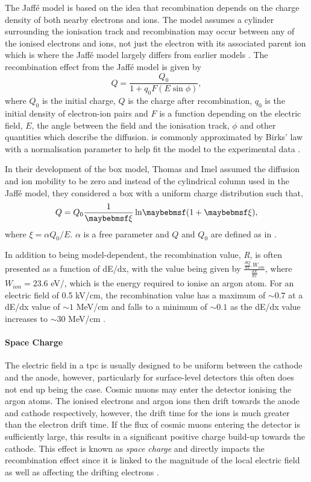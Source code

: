 The Jaff\'{e} model is based on the idea that recombination depends on the charge density of both nearby electrons and ions. The model assumes a cylinder surrounding the ionisation track and recombination may occur between any of the ionised electrons and ions, not just the electron with its associated parent ion which is where the Jaff\'{e} model largely differs from earlier models \cite{Jaffe_model}. The recombination effect from the Jaff\'{e} model is given by 
\begin{equation}\label{Jaffe}
    Q = \frac{Q_{0}}{1+q_{0}F(E\sin{\phi})},
\end{equation}
where $Q_0$ is the initial charge, $Q$ is the charge after recombination, $q_0$ is the initial density of electron-ion pairs and $F$ is a function depending on the electric field, $E$, the angle between the field and the ionisation track, $\phi$ and other quantities which describe the diffusion.  is commonly approximated by Birks' law with a normalisation parameter to help fit the model to the experimental data \cite{LArTPC_book}. 

In their development of the box model, Thomas and Imel assumed the diffusion and ion mobility to be zero and instead of the cylindrical column used in the Jaff\'{e} model, they considered a box with a uniform charge distribution such that, 
\begin{equation}
    Q = Q_{0}\frac{1}{\xi}\lnOfbraces{1+\xi},
\end{equation}
where $\xi = \alpha Q_0/E$. $\alpha$ is a free parameter and $Q$ and $Q_0$ are defined as in \cite{LArTPC_book}\cite{Recombination_box_model}.

In addition to being model-dependent, the recombination value, \textit{R}, is often presented as a function of dE/dx, with the value being given by $\frac{\frac{dQ}{dx}.W_{ion}}{\frac{dE}{dx}}$, where $W_{ion} = 23.6$ eV/\electron, which is the energy required to ionise an argon atom. For an electric field of 0.5 kV/cm, the recombination value has a maximum of $\sim0.7$ at a dE/dx value of $\sim1$ MeV/cm and falls to a minimum of $\sim0.1$ as the dE/dx value increases to $\sim30$ MeV/cm \cite{LArTPC_book}.

\paragraph{Space Charge}
The electric field in a \gls{tpc} is usually designed to be uniform between the cathode and the anode, however, particularly for surface-level detectors this often does not end up being the case. Cosmic muons may enter the detector ionising the argon atoms. The ionised electrons and argon ions then drift towards the anode and cathode respectively, however, the drift time for the ions is much greater than the electron drift time. If the flux of cosmic muons entering the detector is sufficiently large, this results in a significant positive charge build-up towards the cathode. This effect is known as \textit{space charge} and directly impacts the recombination effect since it is linked to the magnitude of the local electric field as well as affecting the drifting electrons \cite{microboone_sce}.

